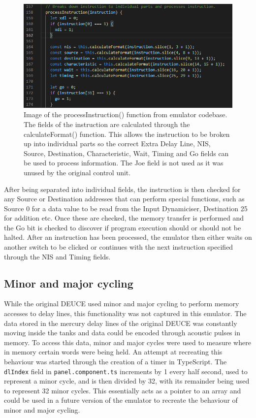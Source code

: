 \documentclass{l4proj}
\begin{document}
\begin{figure}[h]
	\centering
	\includegraphics[width=\linewidth]{images/instruction-fields}
	\caption{Image of the processInstruction() function from emulator codebase. The fields of the instruction are calculated through the calculateFormat() function. This allows the instruction to be broken up into individual parts so the correct Extra Delay Line, NIS, Source, Destination, Characteristic, Wait, Timing and Go fields can be used to process information. The Joe field is not used as it was unused by the original control unit.}
	\label{fig:process-instruction}
\end{figure}

After being separated into individual fields, the instruction is then checked for any Source or Destination addresses that can perform special functions, such as Source 0 for a data value to be read from the Input Dynamiciser, Destination 25 for addition etc. Once these are checked, the memory transfer is performed and the Go bit is checked to discover if program execution should or should not be halted. After an instruction has been processed, the emulator then either waits on another switch to be clicked or continues with the next instruction specified through the NIS and Timing fields.

\subsection{Minor and major cycling}
While the original DEUCE used minor and major cycling to perform memory accesses to delay lines, this functionality was not captured in this emulator. The data stored in the mercury delay lines of the original DEUCE was constantly moving inside the tanks and data could be encoded through acoustic pulses in memory. To access this data, minor and major cycles were used to measure where in memory certain words were being held. An attempt at recreating this behaviour was started through the creation of a timer in TypeScript. The \texttt{dlIndex} field in \texttt{panel.component.ts} increments by 1 every half second, used to represent a minor cycle, and is then divided by 32, with its remainder being used to represent 32 minor cycles. This essentially acts as a pointer to an array and could be used in a future version of the emulator to recreate the behaviour of minor and major cycling.
\end{document}
